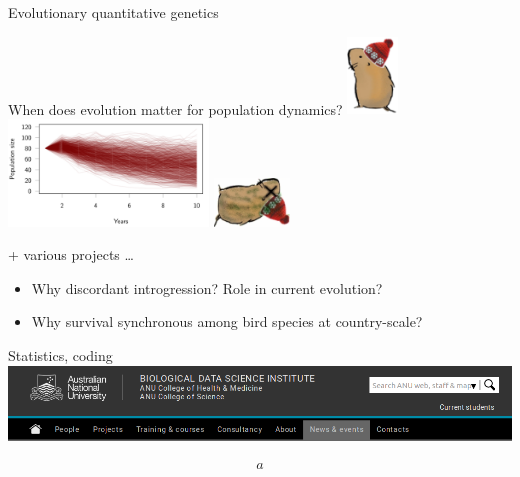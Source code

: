 \documentclass[10pt]{beamer}%
\begin{document}
\begin{frame}{Evolutionary quantitative genetics}
    \pause
    
    \begin{exampleblock}{When does evolution matter for population dynamics?}
    \centering 
    \includegraphics[width=0.1\textwidth]{Figures/snowwwvole2}
    \includegraphics[width=0.4\textwidth]{Figures/stochEx-1}
    \includegraphics[width=0.15\textwidth]{Figures/Deadsnowwwvole2}
    \end{exampleblock}
    
    \pause
        
    \begin{block}{\color{blue} + various projects \dots}
    \begin{itemize}
     \item Why discordant introgression? Role in current evolution?
     \item Why survival synchronous among bird species at country-scale?
    \end{itemize}
   \end{block}

    
\end{frame}
\begin{frame}{Statistics, coding}
\centering
\includegraphics[width=1\textwidth]{Figures/bdsi}

\begin{align*}
 a
\end{align*}

\end{frame}
\end{document}
